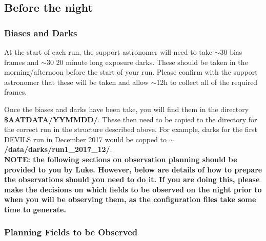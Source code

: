 \documentclass[12pt]{article}
\begin{document}
\subsection{Before the night}


\subsubsection{Biases and Darks}

At the start of each run, the support astronomer will need to take $\sim30$ bias frames and $\sim30$ 20 minute long exposure darks.  These should be taken in the morning/afternoon before the start of your run. Please confirm with the support astronomer that these will be taken and allow $\sim$12h to collect all of the required frames.  

Once the biases and darks have been take, you will find them in the directory \textbf{\$AATDATA/YYMMDD/}. These then need to be copied to the directory for the correct run in the structure described above. For example, darks  for the first DEVILS run in December 2017 would be copped to \textbf{$\sim$/data/darks/run1\_2017\_12/}. \\   

\textbf{\textcolor{PineGreen}{NOTE: the following sections on observation planning should be provided to you by Luke. However, below are details of how to prepare the observations should you need to do it. If you are doing this, please make the decisions on which fields to be observed on the night prior to when you will be observing them, as the configuration files take some time to generate. }}

\subsubsection{Planning Fields to be Observed}
\end{document}
